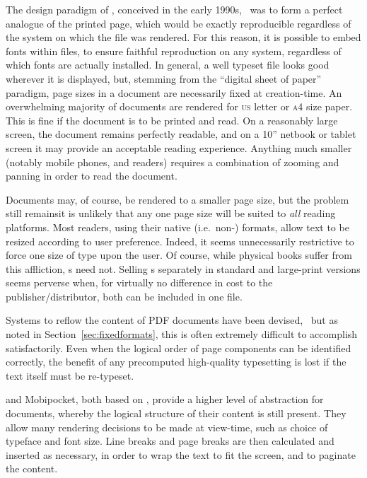 The design paradigm of \pdf{}, conceived in the early 1990s,~\cite{Warnock1991} was to form a perfect analogue of the printed page, which would be exactly reproducible regardless of the system on which the file was rendered. For this reason, it is possible to embed fonts within \pdf{} files, to ensure faithful reproduction on any system, regardless of which fonts are actually installed. In general, a well typeset \pdf{} file looks good wherever it is displayed, but, stemming from the ``digital sheet of paper'' paradigm, page sizes in a \pdf{} document are necessarily fixed at creation-time. An overwhelming majority of \pdf{} documents are rendered for  \textsc{us} letter or \textsc{a}4 size paper. This is fine if the document is to be printed and read. On a reasonably large screen, the document remains perfectly readable, and on a 10'' netbook or tablet screen it may provide an acceptable reading experience. Anything much smaller (notably mobile phones, and \ebook{} readers) requires a combination of zooming and panning  in order to read the document.

Documents may, of course, be rendered to a smaller page size, but the problem still remains\ed it is unlikely that any one page size will be suited to \emph{all} reading platforms. Most \ebook{} readers, using their native (i.e.\ non-\pdf{}) formats, allow text to be resized according to user preference. Indeed, it seems unnecessarily restrictive to force one size of type upon the user. Of course, while physical books suffer from this affliction, \ebook{}s need not. Selling \ebook{}s separately in standard and large-print versions seems perverse when, for virtually no difference in cost to the publisher/distributor, both can be included in one file.

Systems to reflow the content of PDF documents have been devised,~\cite{Lovegrove1995,Marinai2013} but as noted in Section~\ref{sec:fixedformats}, this is often extremely difficult to accomplish satisfactorily. Even when the logical order of page components can be identified correctly, the benefit of any precomputed high-quality typesetting is lost if the text itself must be re-typeset.



\epub{} and Mobipocket, both based on \html{}, provide a higher level of abstraction for documents, whereby the logical structure of their content is still present. They allow many rendering decisions to be made at view-time, such as choice of typeface and font size. Line breaks and page breaks are then calculated and inserted as necessary, in order to wrap the text to fit the screen, and to paginate the content.


